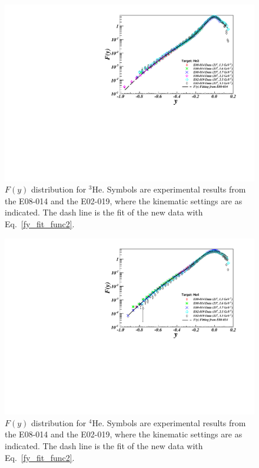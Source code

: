  \begin{figure}[!ht]
  \begin{center}
    \includegraphics[type=pdf,ext=.pdf,read=.pdf,width=.90\textwidth]{./figures/xs/He3_XGT2_Fy}
    \caption[$F(y)$ distribution for $\mathrm{^{3}He}$]{\footnotesize{$F(y)$ distribution for $\mathrm{^{3}He}$. Symbols are experimental results from the E08-014 and the E02-019, where the kinematic settings are as indicated. The dash line is the fit of the new data with Eq.~\eqref{fy_fit_func2}.}}
    \label{fy_he3_xgt2}
  \end{center}
\end{figure}
 \begin{figure}[!ht]
  \begin{center}
    \includegraphics[type=pdf,ext=.pdf,read=.pdf,width=.90\textwidth]{./figures/xs/He4_XGT2_Fy}
    \caption[$F(y)$ distribution for $\mathrm{^{4}He}$]{\footnotesize{$F(y)$ distribution for $\mathrm{^{4}He}$. Symbols are experimental results from the E08-014 and the E02-019, where the kinematic settings are as indicated. The dash line is the fit of the new data with Eq.~\eqref{fy_fit_func2}.}}
    \label{fy_he4_xgt2}
  \end{center}
\end{figure}
